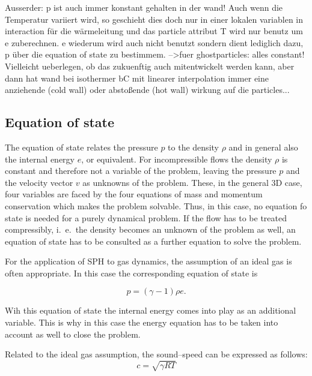 \documentclass{report}
\begin{document}
Ausserder: p ist auch immer konstant gehalten in der wand! Auch wenn die Temperatur variiert wird, so geschieht dies doch nur in einer lokalen variablen in interaction für die wärmeleitung und das particle attribut T wird nur benutz um e zuberechnen. e wiederum wird auch nicht benutzt sondern dient lediglich dazu, p über die equation of state zu bestimmem. -->fuer ghostparticles: alles constant! Vielleicht ueberlegen, ob das zukuenftig auch mitentwickelt werden kann, aber dann hat wand bei isothermer bC mit linearer interpolation immer eine anziehende (cold wall) oder abstoßende (hot wall) wirkung auf die particles...




\subsection{Equation of state}

The equation of state relates the pressure $p$ 
to the density $\rho$ and in general also the internal energy $e$, or equivalent.
For incompressible flows the density $\rho$ is constant and therefore not a variable of the problem, leaving the pressure $p$ and the velocity vector $v$ as unknowns of the problem. These, in the general 3D case, four variables are faced by the four equations of mass and momentum conservation which makes the problem solvable. Thus, in this case,  no equation fo state is needed for a purely dynamical problem. If the flow has to be treated compressibly, i.\ e.\ the density becomes an unknown of the problem as well, an equation of state has to be consulted as a further equation to solve the problem.  

For the application of SPH to gas dynamics, the assumption of an ideal gas is often
appropriate.
In this case the corresponding equation of state is



\begin{equation}
\label{eq:idealGasEqState}
 p=(\gamma-1)\rho e.
\end{equation}

Wih this equation of state the internal energy comes into play as an additional variable. This is why in this case the energy equation has to be taken into account as well to close the problem.

Related to the ideal gas assumption, the sound--speed can be expressed as follows:
\begin{equation}
\label{eq:soundSpeed}
 c=\sqrt{\gamma R T}
\end{equation}
\end{document}
